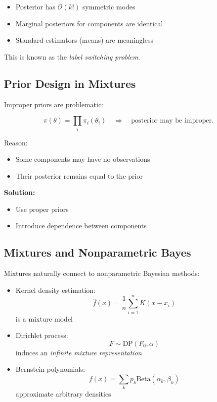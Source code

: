 \documentclass[12pt,oneside]{book}
\numberwithin{equation}{section}
\theoremstyle{definition}
\theoremstyle{plain}
\theoremstyle{remark}
\begin{document}
\begin{itemize}
\item Posterior has $\mathcal{O}(k!)$ symmetric modes
\item Marginal posteriors for components are identical
\item Standard estimators (means) are meaningless
\end{itemize}

This is known as the \emph{label switching problem}.  

\subsection*{Prior Design in Mixtures}

Improper priors are problematic:

\[
\pi(\theta) = \prod_i \pi_i(\theta_i)
\quad \Rightarrow \quad
\text{posterior may be improper}.
\]

Reason:
\begin{itemize}
\item Some components may have no observations
\item Their posterior remains equal to the prior
\end{itemize}

\textbf{Solution:}
\begin{itemize}
\item Use proper priors
\item Introduce dependence between components
\end{itemize}


\subsection*{Mixtures and Nonparametric Bayes}

Mixtures naturally connect to nonparametric Bayesian methods:

\begin{itemize}
\item Kernel density estimation:
\[
\hat f(x) = \frac{1}{n} \sum_{i=1}^n K(x - x_i)
\]
is a mixture model

\item Dirichlet process:
\[
F \sim \text{DP}(F_0, \alpha)
\]
induces an \emph{infinite mixture representation}

\item Bernstein polynomials:
\[
f(x) = \sum_k p_k \text{Beta}(\alpha_k,\beta_k)
\]
approximate arbitrary densities
\end{itemize}
\end{document}
